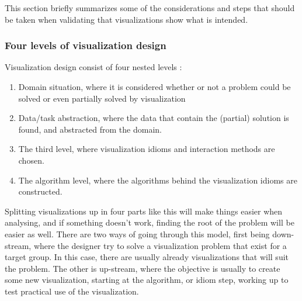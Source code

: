 \documentclass[Report.tex]{subfiles}
\begin{document}
	This section briefly summarizes some of the considerations and steps that should be taken when validating that visualizations show what is intended.
	\subsubsection{Four levels of visualization design}
	Visualization design consist of four  nested levels \cite[68]{Tamara}:
	\begin{enumerate}
		\item Domain situation, where it is considered whether or not a problem could be solved or even partially solved by visualization
		\item Data/task abstraction, where the data that contain the (partial) solution is found, and abstracted from the domain.
		\item The third level, where visualization idioms and interaction methods are chosen.
		\item The algorithm level, where the algorithms behind the visualization idioms are constructed.
	\end{enumerate}
	Splitting visualizations up in four parts like this will make things easier when analysing, and if something doesn't work, finding the root of the problem will be easier as well.
	There are two ways of going through this model, first being down-stream, where the designer try to solve a visualization problem that exist for a target group. In this case, there are usually already visualizations that will suit the problem. The other is up-stream, where the objective is usually to create some new visualization, starting at the algorithm, or idiom step, working up to test practical use of the visualization.
	 
	
\end{document}
